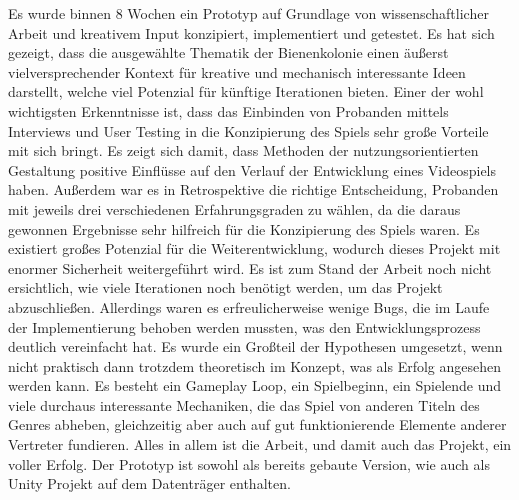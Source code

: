 Es wurde binnen 8 Wochen ein Prototyp auf Grundlage von wissenschaftlicher Arbeit und kreativem Input konzipiert, implementiert und getestet. Es hat sich gezeigt, dass die ausgewählte Thematik der Bienenkolonie einen äußerst vielversprechender Kontext für kreative und mechanisch interessante Ideen darstellt, welche viel Potenzial für künftige Iterationen bieten. Einer der wohl wichtigsten Erkenntnisse ist, dass das Einbinden von Probanden mittels Interviews und User Testing in die Konzipierung des Spiels sehr große Vorteile mit sich bringt. Es zeigt sich damit, dass Methoden der nutzungsorientierten Gestaltung positive Einflüsse auf den Verlauf der Entwicklung eines Videospiels haben. Außerdem war es in Retrospektive die richtige Entscheidung, Probanden mit jeweils drei verschiedenen Erfahrungsgraden zu wählen, da die daraus gewonnen Ergebnisse sehr hilfreich für die Konzipierung des Spiels waren. Es existiert großes Potenzial für die Weiterentwicklung, wodurch dieses Projekt mit enormer Sicherheit weitergeführt wird. Es ist zum Stand der Arbeit noch nicht ersichtlich, wie viele Iterationen noch benötigt werden, um das Projekt abzuschließen. Allerdings waren es erfreulicherweise wenige Bugs, die im Laufe der Implementierung behoben werden mussten, was den Entwicklungsprozess deutlich vereinfacht hat. Es wurde ein Großteil der Hypothesen umgesetzt, wenn nicht praktisch dann trotzdem theoretisch im Konzept, was als Erfolg angesehen werden kann. Es besteht ein Gameplay Loop, ein Spielbeginn, ein Spielende und viele durchaus interessante Mechaniken, die das Spiel von anderen Titeln des Genres abheben, gleichzeitig aber auch auf gut funktionierende Elemente anderer Vertreter fundieren. Alles in allem ist die Arbeit, und damit auch das Projekt, ein voller Erfolg. Der Prototyp ist sowohl als bereits gebaute Version, wie auch als Unity Projekt auf dem Datenträger enthalten.